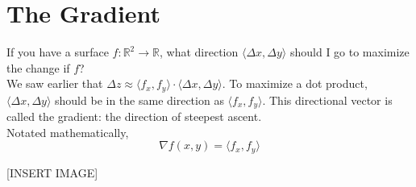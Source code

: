 \section{The Gradient}
\noindent
If you have a surface $f: \mathbb{R}^2 \to \mathbb{R}$, what direction $\langle \Delta x, \Delta y \rangle$ should I go to maximize the change if $f$?\\
We saw earlier that $\Delta z\approx \langle f_x, f_y \rangle \cdot \langle \Delta x, \Delta y \rangle$. To maximize a dot product, $\langle \Delta x, \Delta y \rangle$ should be in the same direction as $\langle f_x, f_y \rangle$. This directional vector is called the gradient: the direction of steepest ascent.\\
Notated mathematically,
\begin{equation*}
	\nabla f(x,y) = \langle f_x, f_y \rangle
\end{equation*}

[INSERT IMAGE]



